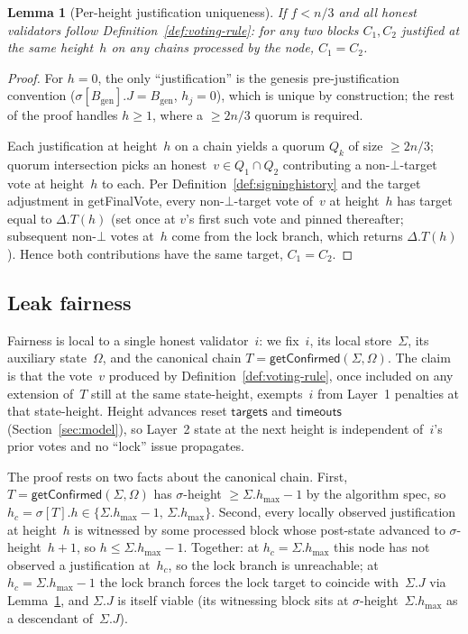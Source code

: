 \ifx\litemode\undefined\documentclass{article}\fi
\newcommand{\genesis}{\ensuremath{B_{\mathrm{gen}}}}
\newcommand{\targets}{\mathsf{targets}}
\newcommand{\timeouts}{\mathsf{timeouts}}
\newcommand{\hmax}{\ensuremath{h_{\max}}\xspace}
\newcommand{\getFinalVote}{\textsf{getFinalVote}\xspace}
\newcommand{\getConfirmed}{\textsf{getConfirmed}\xspace}
\theoremstyle{plain}
\newtheorem{lemma}{Lemma}
\theoremstyle{definition}
\theoremstyle{remark}
\begin{document}
\begin{lemma}[Per-height justification uniqueness]\label{lem:just-unique-height}
If $f < n/3$ and all honest validators follow Definition~\ref{def:voting-rule}: for any two blocks $C_1, C_2$ justified at the same height~$h$ on any chains processed by the node, $C_1 = C_2$.
\end{lemma}

\begin{proof}
For $h = 0$, the only ``justification'' is the genesis pre-justification convention ($\sigma[\genesis].J = \genesis$, $h_j = 0$), which is unique by construction; the rest of the proof handles $h \geq 1$, where a $\geq 2n/3$ quorum is required.

Each justification at height~$h$ on a chain yields a quorum $Q_k$ of size $\geq 2n/3$; quorum intersection picks an honest~$v \in Q_1 \cap Q_2$ contributing a non-$\bot$-target vote at height~$h$ to each.
Per Definition~\ref{def:signinghistory} and the target adjustment in \getFinalVote, every non-$\bot$-target vote of~$v$ at height~$h$ has target equal to $\Delta.T(h)$ (set once at $v$'s first such vote and pinned thereafter; subsequent non-$\bot$ votes at~$h$ come from the lock branch, which returns $\Delta.T(h)$).
Hence both contributions have the same target, $C_1 = C_2$.
\end{proof}

\subsection{Leak fairness}

Fairness is local to a single honest validator~$i$: we fix~$i$, its local store~$\Sigma$, its auxiliary state~$\Omega$, and the canonical chain $T = \getConfirmed(\Sigma, \Omega)$.
The claim is that the vote~$v$ produced by Definition~\ref{def:voting-rule}, once included on any extension of~$T$ still at the same state-height, exempts~$i$ from Layer~1 penalties at that state-height.
Height advances reset $\targets$ and $\timeouts$ (Section~\ref{sec:model}), so Layer~2 state at the next height is independent of~$i$'s prior votes and no ``lock'' issue propagates.

The proof rests on two facts about the canonical chain.
First, $T = \getConfirmed(\Sigma,\Omega)$ has $\sigma$-height $\geq \Sigma.\hmax - 1$ by the algorithm spec, so $h_c = \sigma[T].h \in \{\Sigma.\hmax - 1,\, \Sigma.\hmax\}$.
Second, every locally observed justification at height~$h$ is witnessed by some processed block whose post-state advanced to $\sigma$-height~$h+1$, so $h \leq \Sigma.\hmax - 1$.
Together: at $h_c = \Sigma.\hmax$ this node has not observed a justification at~$h_c$, so the lock branch is unreachable; at $h_c = \Sigma.\hmax - 1$ the lock branch forces the lock target to coincide with~$\Sigma.J$ via Lemma~\ref{lem:just-unique-height}, and $\Sigma.J$ is itself viable (its witnessing block sits at $\sigma$-height~$\Sigma.\hmax$ as a descendant of~$\Sigma.J$).
\end{document}
